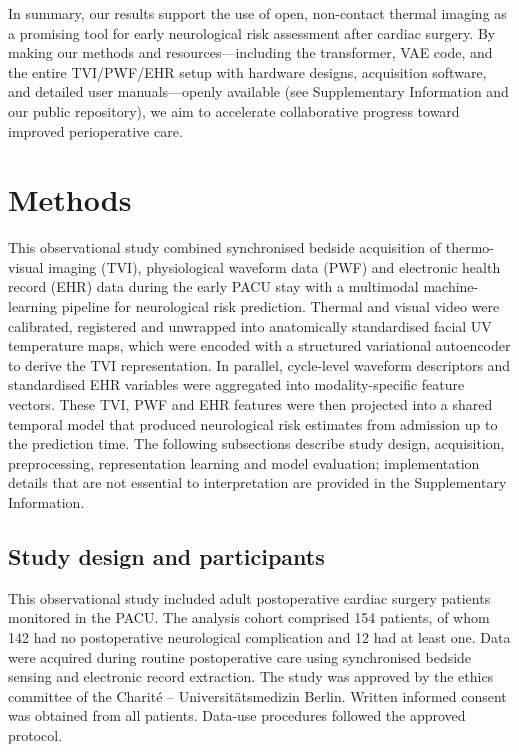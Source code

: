 \documentclass[11pt]{article}
\begin{document}
In summary, our results support the use of open, non-contact thermal imaging as a promising tool for early neurological risk assessment after cardiac surgery. By making our methods and resources—including the transformer, VAE code, and the entire TVI/PWF/EHR setup with hardware designs, acquisition software, and detailed user manuals—openly available (see Supplementary Information and our public repository), we aim to accelerate collaborative progress toward improved perioperative care.

\section*{Methods}

This observational study combined synchronised bedside acquisition of thermo-visual imaging (TVI), physiological waveform data (PWF) and electronic health record (EHR) data during the early PACU stay with a multimodal machine-learning pipeline for neurological risk prediction. Thermal and visual video were calibrated, registered and unwrapped into anatomically standardised facial UV temperature maps, which were encoded with a structured variational autoencoder to derive the TVI representation. In parallel, cycle-level waveform descriptors and standardised EHR variables were aggregated into modality-specific feature vectors. These TVI, PWF and EHR features were then projected into a shared temporal model that produced neurological risk estimates from admission up to the prediction time. The following subsections describe study design, acquisition, preprocessing, representation learning and model evaluation; implementation details that are not essential to interpretation are provided in the Supplementary Information.

\subsection*{Study design and participants}

This observational study included adult postoperative cardiac surgery patients monitored in the PACU. The analysis cohort comprised 154 patients, of whom 142 had no postoperative neurological complication and 12 had at least one. Data were acquired during routine postoperative care using synchronised bedside sensing and electronic record extraction. The study was approved by the ethics committee of the Charité – Universitätsmedizin Berlin. Written informed consent was obtained from all patients. Data-use procedures followed the approved protocol.
\end{document}
